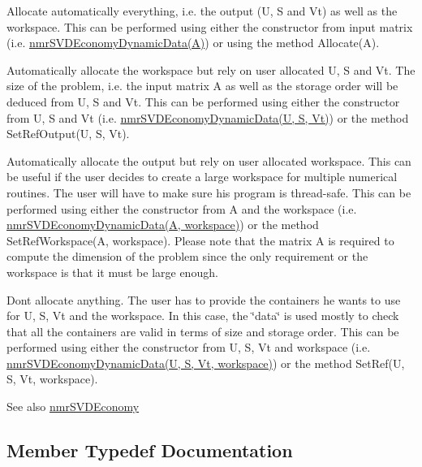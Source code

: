 \begin{DoxyItemize}
\item Allocate automatically everything, i.\+e. the output (U, S and Vt) as well as the workspace. This can be performed using either the constructor from input matrix (i.\+e. \hyperlink{classnmr_s_v_d_economy_dynamic_data}{nmr\+S\+V\+D\+Economy\+Dynamic\+Data(\+A)}) or using the method Allocate(\+A).
\item Automatically allocate the workspace but rely on user allocated U, S and Vt. The size of the problem, i.\+e. the input matrix A as well as the storage order will be deduced from U, S and Vt. This can be performed using either the constructor from U, S and Vt (i.\+e. \hyperlink{classnmr_s_v_d_economy_dynamic_data}{nmr\+S\+V\+D\+Economy\+Dynamic\+Data(\+U, S, Vt)}) or the method Set\+Ref\+Output(\+U, S, Vt).
\item Automatically allocate the output but rely on user allocated workspace. This can be useful if the user decides to create a large workspace for multiple numerical routines. The user will have to make sure his program is thread-\/safe. This can be performed using either the constructor from A and the workspace (i.\+e. \hyperlink{classnmr_s_v_d_economy_dynamic_data}{nmr\+S\+V\+D\+Economy\+Dynamic\+Data(\+A, workspace)}) or the method Set\+Ref\+Workspace(\+A, workspace). Please note that the matrix A is required to compute the dimension of the problem since the only requirement or the workspace is that it must be large enough.
\item Don\textquotesingle{}t allocate anything. The user has to provide the containers he wants to use for U, S, Vt and the workspace. In this case, the \char`\"{}data\char`\"{} is used mostly to check that all the containers are valid in terms of size and storage order. This can be performed using either the constructor from U, S, Vt and workspace (i.\+e. \hyperlink{classnmr_s_v_d_economy_dynamic_data}{nmr\+S\+V\+D\+Economy\+Dynamic\+Data(\+U, S, Vt, workspace)}) or the method Set\+Ref(\+U, S, Vt, workspace).
\end{DoxyItemize}

\begin{DoxySeeAlso}{See also}
\hyperlink{nmr_s_v_d_economy_8h_a7a5496ff2d20946e8738baac82318603}{nmr\+S\+V\+D\+Economy} 
\end{DoxySeeAlso}


\subsection{Member Typedef Documentation}
\hypertarget{classnmr_s_v_d_economy_dynamic_data_a237cfc6761af61ac2016b2b1e71284f1}{}
